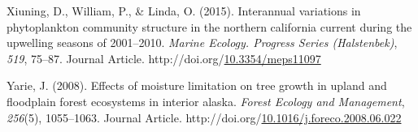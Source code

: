 \documentclass [11pt, proquest] {uwthesis}[2015/03/03]
\newlength{\cslhangindent}
\newenvironment{CSLReferences}%
{\setlength{\parindent}{0pt}%
\everypar{\setlength{\hangindent}{\cslhangindent}}\ignorespaces}%
{\par}
\begin{document}
\begin{CSLReferences}{1}{0}
\leavevmode\hypertarget{ref-Du2015}{}%
Xiuning, D., William, P., \& Linda, O. (2015). Interannual variations in phytoplankton community structure in the northern california current during the upwelling seasons of 2001--2010. \emph{Marine Ecology. Progress Series (Halstenbek)}, \emph{519}, 75--87. Journal Article. http://doi.org/\href{https://doi.org/10.3354/meps11097}{10.3354/meps11097}

\leavevmode\hypertarget{ref-Yarie2008}{}%
Yarie, J. (2008). Effects of moisture limitation on tree growth in upland and floodplain forest ecosystems in interior alaska. \emph{Forest Ecology and Management}, \emph{256}(5), 1055--1063. Journal Article. http://doi.org/\href{https://doi.org/10.1016/j.foreco.2008.06.022}{10.1016/j.foreco.2008.06.022}

\end{CSLReferences}
\end{document}

